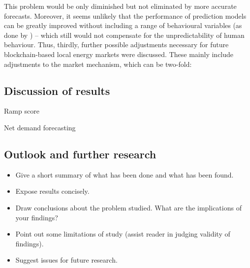 This problem would be only diminished but not eliminated by more accurate forecasts. Moreover, it seems unlikely that the performance of prediction models can be greatly improved without including a range of behavioural variables (as done by \citet{Kong:2018}) -- which still would not compensate for the unpredictability of human behaviour. Thus, thirdly, further possible adjustments necessary for future blockchain-based local energy markets were discussed. These mainly include adjustments to the market mechanism, which can be two-fold:




\subsection{Discussion of results}\label{Sec:Conclusion;Subsec:Discussion}

Ramp score

Net demand forecasting \citep{Meer:2018}



\subsection{Outlook and further research}\label{Sec:Conclusion;Subsec:Outlook}




\begin{itemize}

    \item Give a short summary of what has been done and what has been
    found.

    \item Expose results concisely.

    \item Draw conclusions about the problem studied. What are the
    implications of your findings?

    \item Point out some limitations of study (assist reader in judging validity
    of findings).

    \item Suggest issues for future research.

\end{itemize}
